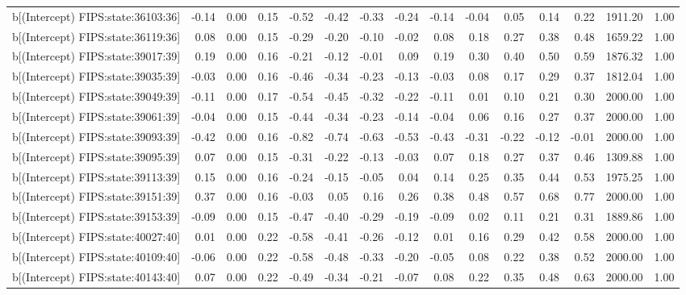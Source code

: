 \begin{table}[ht]
\begin{tabular}{rrrrrrrrrrrrrrr}
  b[(Intercept) FIPS:state:36103:36] & -0.14 & 0.00 & 0.15 & -0.52 & -0.42 & -0.33 & -0.24 & -0.14 & -0.04 & 0.05 & 0.14 & 0.22 & 1911.20 & 1.00 \\ 
  b[(Intercept) FIPS:state:36119:36] & 0.08 & 0.00 & 0.15 & -0.29 & -0.20 & -0.10 & -0.02 & 0.08 & 0.18 & 0.27 & 0.38 & 0.48 & 1659.22 & 1.00 \\ 
  b[(Intercept) FIPS:state:39017:39] & 0.19 & 0.00 & 0.16 & -0.21 & -0.12 & -0.01 & 0.09 & 0.19 & 0.30 & 0.40 & 0.50 & 0.59 & 1876.32 & 1.00 \\ 
  b[(Intercept) FIPS:state:39035:39] & -0.03 & 0.00 & 0.16 & -0.46 & -0.34 & -0.23 & -0.13 & -0.03 & 0.08 & 0.17 & 0.29 & 0.37 & 1812.04 & 1.00 \\ 
  b[(Intercept) FIPS:state:39049:39] & -0.11 & 0.00 & 0.17 & -0.54 & -0.45 & -0.32 & -0.22 & -0.11 & 0.01 & 0.10 & 0.21 & 0.30 & 2000.00 & 1.00 \\ 
  b[(Intercept) FIPS:state:39061:39] & -0.04 & 0.00 & 0.15 & -0.44 & -0.34 & -0.23 & -0.14 & -0.04 & 0.06 & 0.16 & 0.27 & 0.37 & 2000.00 & 1.00 \\ 
  b[(Intercept) FIPS:state:39093:39] & -0.42 & 0.00 & 0.16 & -0.82 & -0.74 & -0.63 & -0.53 & -0.43 & -0.31 & -0.22 & -0.12 & -0.01 & 2000.00 & 1.00 \\ 
  b[(Intercept) FIPS:state:39095:39] & 0.07 & 0.00 & 0.15 & -0.31 & -0.22 & -0.13 & -0.03 & 0.07 & 0.18 & 0.27 & 0.37 & 0.46 & 1309.88 & 1.00 \\ 
  b[(Intercept) FIPS:state:39113:39] & 0.15 & 0.00 & 0.16 & -0.24 & -0.15 & -0.05 & 0.04 & 0.14 & 0.25 & 0.35 & 0.44 & 0.53 & 1975.25 & 1.00 \\ 
  b[(Intercept) FIPS:state:39151:39] & 0.37 & 0.00 & 0.16 & -0.03 & 0.05 & 0.16 & 0.26 & 0.38 & 0.48 & 0.57 & 0.68 & 0.77 & 2000.00 & 1.00 \\ 
  b[(Intercept) FIPS:state:39153:39] & -0.09 & 0.00 & 0.15 & -0.47 & -0.40 & -0.29 & -0.19 & -0.09 & 0.02 & 0.11 & 0.21 & 0.31 & 1889.86 & 1.00 \\ 
  b[(Intercept) FIPS:state:40027:40] & 0.01 & 0.00 & 0.22 & -0.58 & -0.41 & -0.26 & -0.12 & 0.01 & 0.16 & 0.29 & 0.42 & 0.58 & 2000.00 & 1.00 \\ 
  b[(Intercept) FIPS:state:40109:40] & -0.06 & 0.00 & 0.22 & -0.58 & -0.48 & -0.33 & -0.20 & -0.05 & 0.08 & 0.22 & 0.38 & 0.52 & 2000.00 & 1.00 \\ 
  b[(Intercept) FIPS:state:40143:40] & 0.07 & 0.00 & 0.22 & -0.49 & -0.34 & -0.21 & -0.07 & 0.08 & 0.22 & 0.35 & 0.48 & 0.63 & 2000.00 & 1.00 \\ 

\end{tabular}
\end{table}
